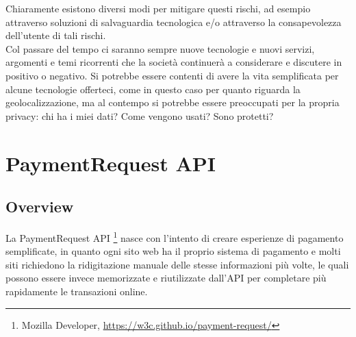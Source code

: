 \documentclass[11pt ,a4paper , twoside , openright ]{book}
\begin{document}
	Chiaramente esistono diversi modi per mitigare questi rischi, ad esempio attraverso soluzioni di salvaguardia tecnologica e/o attraverso la consapevolezza dell'utente di tali rischi.
	\\
	Col passare del tempo ci saranno sempre nuove tecnologie e nuovi servizi, argomenti e temi ricorrenti che la società continuerà a considerare e discutere in positivo o negativo.
	Si potrebbe essere contenti di avere la vita semplificata per alcune tecnologie offerteci, come in questo caso per quanto riguarda la geolocalizzazione, ma al contempo si potrebbe essere preoccupati per la propria privacy: chi ha i miei dati? Come vengono usati? Sono protetti?
	\cleardoublepage
	
	\chapter{PaymentRequest API}
	
	\section{Overview}
	La PaymentRequest API \footnote{Mozilla Developer, \url{https://w3c.github.io/payment-request/}} nasce con l'intento di creare esperienze di pagamento semplificate, in quanto ogni sito web ha il proprio sistema di pagamento e molti siti richiedono la ridigitazione manuale delle stesse informazioni più volte, le quali possono essere invece memorizzate e riutilizzate dall'API per completare più rapidamente le transazioni online.
	
\end{document}
